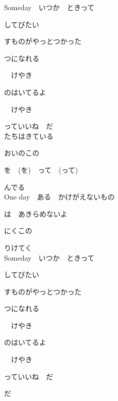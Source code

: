 Someday　いつか　ときって

してびたい

すものがやっとつかった

つになれる

　けやき

のはいてるよ

　けやき

っていいね　だ
\\

たちはきている

おいのこの

を　(を)　って　(って)

んでる
\\

One day　ある　かけがえないもの

は　あきらめないよ

にくこの

りけてく
\\

Someday　いつか　ときって

してびたい

すものがやっとつかった

つになれる

　けやき

のはいてるよ

　けやき

っていいね　だ

だ
\\